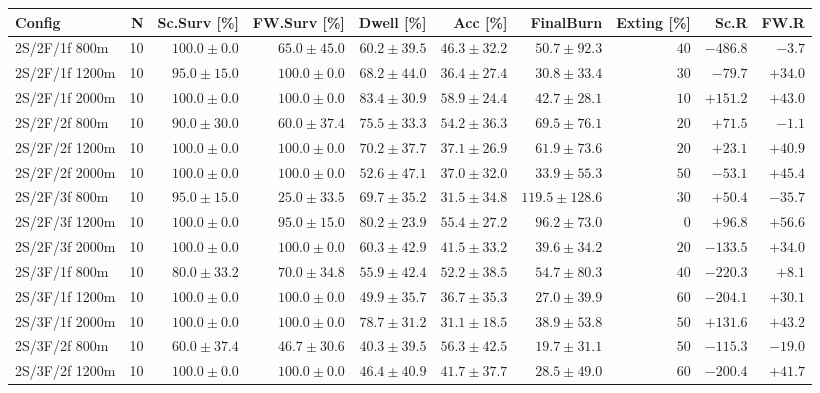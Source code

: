 \begin{tabular}{l r r r r r r r r r}
\toprule
Config & N & Sc.Surv [\%] & FW.Surv [\%] & Dwell [\%] & Acc [\%] & FinalBurn & Exting [\%] & Sc.R & FW.R \\
\midrule
2S/2F/1f 800m & 10 & $100.0 \pm 0.0$ & $65.0 \pm 45.0$ & $60.2 \pm 39.5$ & $46.3 \pm 32.2$ & $50.7 \pm 92.3$ & $40$ & $-486.8$ & $-3.7$ \\
2S/2F/1f 1200m & 10 & $95.0 \pm 15.0$ & $100.0 \pm 0.0$ & $68.2 \pm 44.0$ & $36.4 \pm 27.4$ & $30.8 \pm 33.4$ & $30$ & $-79.7$ & $+34.0$ \\
2S/2F/1f 2000m & 10 & $100.0 \pm 0.0$ & $100.0 \pm 0.0$ & $83.4 \pm 30.9$ & $58.9 \pm 24.4$ & $42.7 \pm 28.1$ & $10$ & $+151.2$ & $+43.0$ \\
2S/2F/2f 800m & 10 & $90.0 \pm 30.0$ & $60.0 \pm 37.4$ & $75.5 \pm 33.3$ & $54.2 \pm 36.3$ & $69.5 \pm 76.1$ & $20$ & $+71.5$ & $-1.1$ \\
2S/2F/2f 1200m & 10 & $100.0 \pm 0.0$ & $100.0 \pm 0.0$ & $70.2 \pm 37.7$ & $37.1 \pm 26.9$ & $61.9 \pm 73.6$ & $20$ & $+23.1$ & $+40.9$ \\
2S/2F/2f 2000m & 10 & $100.0 \pm 0.0$ & $100.0 \pm 0.0$ & $52.6 \pm 47.1$ & $37.0 \pm 32.0$ & $33.9 \pm 55.3$ & $50$ & $-53.1$ & $+45.4$ \\
2S/2F/3f 800m & 10 & $95.0 \pm 15.0$ & $25.0 \pm 33.5$ & $69.7 \pm 35.2$ & $31.5 \pm 34.8$ & $119.5 \pm 128.6$ & $30$ & $+50.4$ & $-35.7$ \\
2S/2F/3f 1200m & 10 & $100.0 \pm 0.0$ & $95.0 \pm 15.0$ & $80.2 \pm 23.9$ & $55.4 \pm 27.2$ & $96.2 \pm 73.0$ & $0$ & $+96.8$ & $+56.6$ \\
2S/2F/3f 2000m & 10 & $100.0 \pm 0.0$ & $100.0 \pm 0.0$ & $60.3 \pm 42.9$ & $41.5 \pm 33.2$ & $39.6 \pm 34.2$ & $20$ & $-133.5$ & $+34.0$ \\
2S/3F/1f 800m & 10 & $80.0 \pm 33.2$ & $70.0 \pm 34.8$ & $55.9 \pm 42.4$ & $52.2 \pm 38.5$ & $54.7 \pm 80.3$ & $40$ & $-220.3$ & $+8.1$ \\
2S/3F/1f 1200m & 10 & $100.0 \pm 0.0$ & $100.0 \pm 0.0$ & $49.9 \pm 35.7$ & $36.7 \pm 35.3$ & $27.0 \pm 39.9$ & $60$ & $-204.1$ & $+30.1$ \\
2S/3F/1f 2000m & 10 & $100.0 \pm 0.0$ & $100.0 \pm 0.0$ & $78.7 \pm 31.2$ & $31.1 \pm 18.5$ & $38.9 \pm 53.8$ & $50$ & $+131.6$ & $+43.2$ \\
2S/3F/2f 800m & 10 & $60.0 \pm 37.4$ & $46.7 \pm 30.6$ & $40.3 \pm 39.5$ & $56.3 \pm 42.5$ & $19.7 \pm 31.1$ & $50$ & $-115.3$ & $-19.0$ \\
2S/3F/2f 1200m & 10 & $100.0 \pm 0.0$ & $100.0 \pm 0.0$ & $46.4 \pm 40.9$ & $41.7 \pm 37.7$ & $28.5 \pm 49.0$ & $60$ & $-200.4$ & $+41.7$ \\

\end{tabular}
